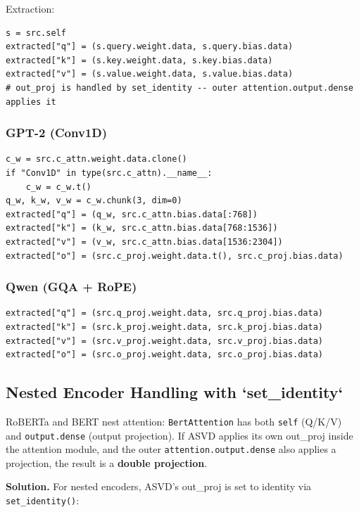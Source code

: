 Extraction:

\begin{lstlisting}
s = src.self
extracted["q"] = (s.query.weight.data, s.query.bias.data)
extracted["k"] = (s.key.weight.data, s.key.bias.data)
extracted["v"] = (s.value.weight.data, s.value.bias.data)
# out_proj is handled by set_identity -- outer attention.output.dense applies it
\end{lstlisting}

\subsubsection{GPT-2 (Conv1D)}

\begin{lstlisting}
c_w = src.c_attn.weight.data.clone()
if "Conv1D" in type(src.c_attn).__name__:
    c_w = c_w.t()
q_w, k_w, v_w = c_w.chunk(3, dim=0)
extracted["q"] = (q_w, src.c_attn.bias.data[:768])
extracted["k"] = (k_w, src.c_attn.bias.data[768:1536])
extracted["v"] = (v_w, src.c_attn.bias.data[1536:2304])
extracted["o"] = (src.c_proj.weight.data.t(), src.c_proj.bias.data)
\end{lstlisting}

\subsubsection{Qwen (GQA + RoPE)}

\begin{lstlisting}
extracted["q"] = (src.q_proj.weight.data, src.q_proj.bias.data)
extracted["k"] = (src.k_proj.weight.data, src.k_proj.bias.data)
extracted["v"] = (src.v_proj.weight.data, src.v_proj.bias.data)
extracted["o"] = (src.o_proj.weight.data, src.o_proj.bias.data)
\end{lstlisting}

\subsection{Nested Encoder Handling with `set\_identity`}

RoBERTa and BERT nest attention: \texttt{BertAttention} has both \texttt{self} (Q/K/V) 
and \texttt{output.dense} (output projection). If ASVD applies its own out\_proj 
inside the attention module, and the outer \texttt{attention.output.dense} also 
applies a projection, the result is a \textbf{double projection}.

\textbf{Solution.} For nested encoders, ASVD's out\_proj is set to identity via 
\texttt{set\_identity()}:

